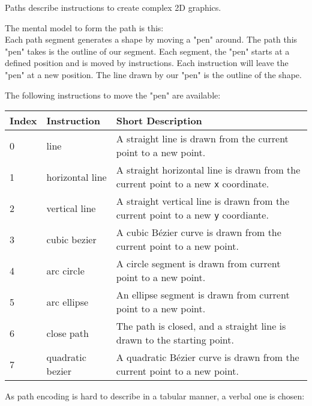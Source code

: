 \documentclass[]{article}
\begin{document}
Paths describe instructions to create complex 2D graphics.

The mental model to form the path is this:\\
Each path segment generates a shape by moving a "pen" around. The path
this "pen" takes is the outline of our segment. Each segment, the "pen"
starts at a defined position and is moved by instructions. Each
instruction will leave the "pen" at a new position. The line drawn by
our "pen" is the outline of the shape.

The following instructions to move the "pen" are available:

\begin{longtable}[]{@{}p{0.5in}p{1.0in}p{4.5in}@{}}
\toprule
Index & Instruction & Short Description \\
\midrule
\endhead
0 & line & A straight line is drawn from the current point to a new
point. \\
1 & horizontal line & A straight horizontal line is drawn from the current point to a new \texttt{x} coordinate. \\
2 & vertical line & A straight vertical line is drawn from the current point to a new \texttt{y} coordiante. \\
3 & cubic bezier & A cubic Bézier curve is drawn from the current point to a new point. \\
4 & arc circle & A circle segment is drawn from current point to a new point. \\
5 & arc ellipse & An ellipse segment is drawn from current point to a new point. \\
6 & close path & The path is closed, and a straight line is drawn to the starting point. \\
7 & quadratic bezier & A quadratic Bézier curve is drawn from the current point to a new point. \\
\bottomrule
\end{longtable}

As path encoding is hard to describe in a tabular manner, a verbal one
is chosen:
\end{document}
